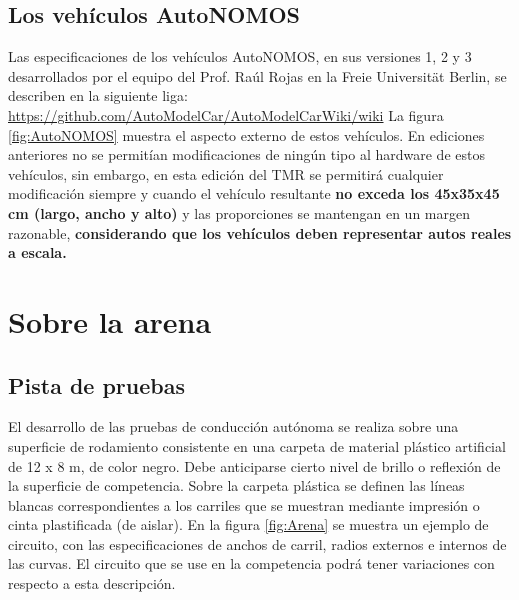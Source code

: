 \documentclass[letterpaper,12pt]{article}
\begin{document}
\subsection{Los vehículos AutoNOMOS}

Las especificaciones de los vehículos AutoNOMOS, en sus versiones 1, 2 y 3 desarrollados por el equipo del Prof. Raúl Rojas en la Freie Universität Berlin, se describen en la siguiente liga:
\url{https://github.com/AutoModelCar/AutoModelCarWiki/wiki}
La figura \ref{fig:AutoNOMOS} muestra el aspecto externo de estos vehículos. En ediciones anteriores no se permitían modificaciones de ningún tipo al hardware de estos vehículos, sin embargo, en esta edición del TMR se permitirá cualquier modificación siempre y cuando el vehículo resultante \textbf{no exceda los 45x35x45 cm (largo, ancho y alto)} y las proporciones se mantengan en un margen razonable, \textbf{considerando que los vehículos deben representar autos reales a escala. }


\section{Sobre la arena}
\subsection{Pista de pruebas}
El desarrollo de las pruebas de conducción autónoma se realiza sobre una superficie de rodamiento consistente en una carpeta de material plástico artificial de 12 x 8 m, de color negro. Debe anticiparse cierto nivel de brillo o reflexión de la superficie de competencia. Sobre la carpeta plástica se definen las líneas blancas correspondientes a los carriles que se muestran mediante impresión o cinta plastificada (de aislar). En la figura \ref{fig:Arena} se muestra un ejemplo de circuito, con las especificaciones de anchos de carril, radios externos e internos de las curvas. El circuito que se use en la competencia podrá tener variaciones con respecto a esta descripción.
\end{document}
